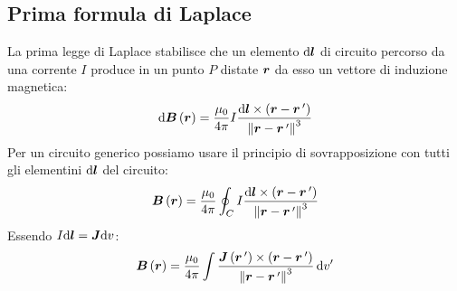 \subsection{Prima formula di Laplace}
La prima legge di Laplace stabilisce che un elemento $\mathrm{d} \boldsymbol{l}$ di circuito percorso da una corrente $I$ produce in un punto $P$ distate $\boldsymbol{r}$ da esso un vettore di induzione magnetica:
\begin{equation}
\mathrm{d}\boldsymbol{B}\left(\boldsymbol{r}\right)=\frac{\mu_0}{4\pi}I\frac{\mathrm{d}\boldsymbol{l}\times\left(\boldsymbol{r}-\boldsymbol{r}\,'\right)}{\left\lVert\boldsymbol{r}-\boldsymbol{r}\,'\right\rVert^3}
\end{equation}
Per un circuito generico possiamo usare il principio di sovrapposizione con tutti gli elementini $\mathrm{d}\boldsymbol{l}$  del circuito:
\begin{equation}
\boldsymbol{B}\left(\boldsymbol{r}\right)=\frac{\mu_0}{4\pi}\oint_C I\frac{\mathrm{d}\boldsymbol{l}\times\left(\boldsymbol{r}-\boldsymbol{r}\,'\right)}{\left\lVert\boldsymbol{r}-\boldsymbol{r}\,'\right\rVert^3}
\label{campo_spira_laplace}
\end{equation}
Essendo $I\mathrm{d} \boldsymbol{l}=\boldsymbol{J}\mathrm{d} v$:
\begin{equation}
\boldsymbol{B}\left(\boldsymbol{r}\right)=\frac{\mu_0}{4\pi}\int\frac{\boldsymbol{J}\left(\boldsymbol{r}\,'\right)\times\left(\boldsymbol{r}-\boldsymbol{r}\,'\right)}{\left\lVert\boldsymbol{r}-\boldsymbol{r}\,'\right\rVert^3}\,\mathrm{d} v'
\end{equation}
